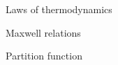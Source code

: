 \documentclass{article}
\begin{document}
\begin{multicols}{2}

Laws of thermodynamics

Maxwell relations

Partition function

\end{multicols}
\end{document}
